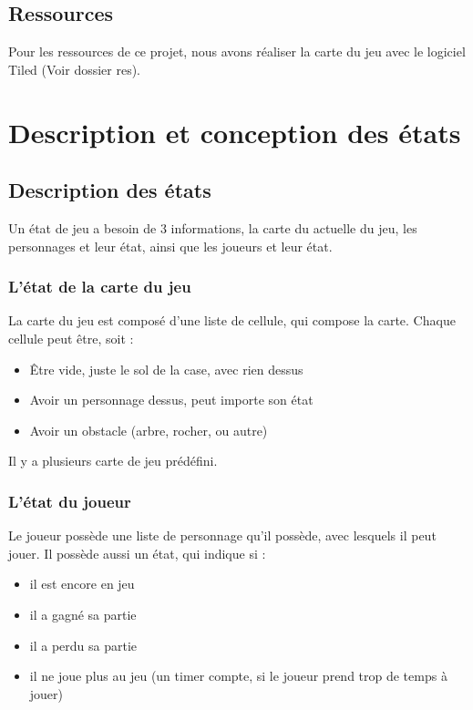 \documentclass[a4paper,12pt]{article}
\begin{document}
\subsection{Ressources}

Pour les ressources de ce projet, nous avons réaliser la carte du jeu avec le logiciel Tiled 
(Voir dossier res).


\clearpage
\section{Description et conception des états}

\subsection{Description des états}

Un état de jeu a besoin de 3 informations, la carte du actuelle du jeu,
les personnages et leur état, ainsi que les joueurs et leur état.

\subsubsection{L'état de la carte du jeu}

La carte du jeu est composé d'une liste de cellule, qui compose la carte.
Chaque cellule peut être, soit :
\begin{itemize}
  \item Être vide, juste le sol de la case, avec rien dessus
  \item Avoir un personnage dessus, peut importe son état
  \item Avoir un obstacle (arbre, rocher, ou autre)
\end{itemize}

Il y a plusieurs carte de jeu prédéfini.

\subsubsection{L'état du joueur}

Le joueur possède une liste de personnage qu'il possède, avec lesquels il peut jouer.
Il possède aussi un état, qui indique si :
\begin{itemize}
  \item il est encore en jeu
  \item il a gagné sa partie
  \item il a perdu sa partie
  \item il ne joue plus au jeu  (un timer compte, si le joueur prend trop de temps à jouer)
\end{itemize}
\end{document}

